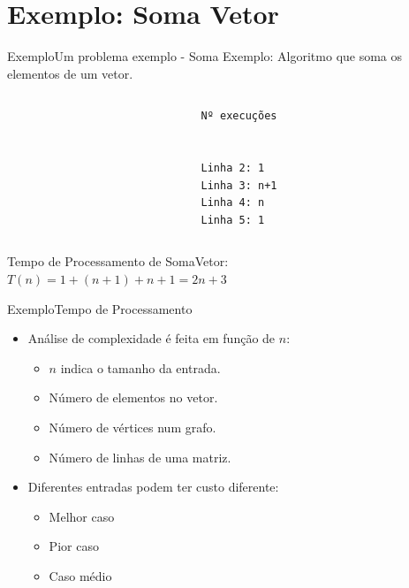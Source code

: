 \documentclass[aspectratio=169]{beamer}
\begin{document}
\section{Exemplo: Soma Vetor}

\begin{frame}[fragile]{Exemplo}{Um problema exemplo - Soma}
Exemplo: Algoritmo que soma os elementos de um vetor.
\begin{columns}[T] %
\begin{column}{.68\textwidth}
\end{column}%
\hfill%
\begin{column}{.28\textwidth}
\begin{verbatim}
Nº execuções


Linha 2: 1
Linha 3: n+1
Linha 4: n
Linha 5: 1
\end{verbatim}
\end{column}%
\end{columns}

Tempo de Processamento de SomaVetor:\\
$T(n) = 1 + (n+1) + n + 1 = 2n+3$
\end{frame}


\begin{frame}{Exemplo}{Tempo de Processamento}
\begin{itemize}
\item Análise de complexidade é feita em função de $n$:
\begin{itemize}
\item $n$ indica o tamanho da entrada.
\item Número de elementos no vetor.
\item Número de vértices num grafo.
\item Número de linhas de uma matriz.
\end{itemize}
\item Diferentes entradas podem ter custo diferente:
\begin{itemize}
\item Melhor caso
\item Pior caso
\item Caso médio
\end{itemize}
\end{itemize}
\end{frame}
\end{document}
